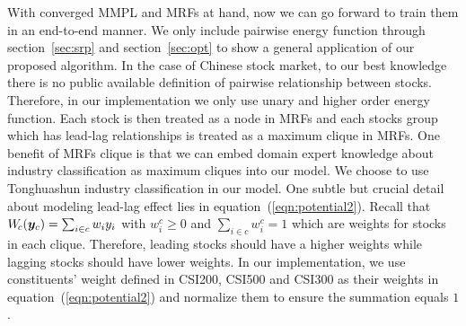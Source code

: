 With converged MMPL and MRFs at hand, now we can go forward to
train them in an end-to-end manner. We only include pairwise
energy function through section~\ref{sec:srp} and
section~\ref{sec:opt} to show a general application of our
proposed algorithm. In the case of Chinese stock market, to our
best knowledge there is no public available definition of
pairwise relationship between stocks. Therefore, in our
implementation we only use unary and higher order energy
function. Each stock is then treated as a node in MRFs and each
stocks group which has lead-lag relationships is treated as a
maximum clique in MRFs. One benefit of MRFs clique is that we can
embed domain expert knowledge about industry classification as
maximum cliques into our model. We choose to use Tonghuashun
industry classification \cite{ths} in our model. One subtle but
crucial detail about modeling lead-lag effect lies in
equation~(\ref{eqn:potential2}). Recall that $W_{\!c}({\bm{y}}_c) =
\sum_{i \in c} w_i y_i$ with $w^c_i \geq 0$ and $\sum_{i \in c}
w^c_i = 1$ which are weights for stocks in each clique.
Therefore, leading stocks should have a higher weights while
lagging stocks should have lower weights. In our implementation,
we use constituents' weight defined in CSI200, CSI500 and CSI300
as their weights in equation~(\ref{eqn:potential2}) and normalize
them to ensure the summation equals $1$.



